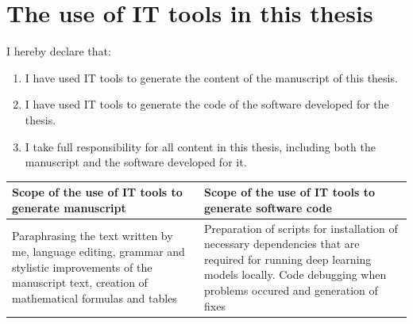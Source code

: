 \documentclass[12pt,a4paper]{article}
\begin{document}
\section*{The use of IT tools in this thesis}
\vspace{3pt}

I hereby declare that:
\begin{enumerate}
    \item I have used IT tools to generate the content of the manuscript of this thesis.
    \item I have used IT tools to generate the code of the software developed for the thesis.
    \item I take full responsibility for all content in this thesis, including both the manuscript and the software developed for it.
\end{enumerate}

\vspace{6pt}

\begin{table}[h]
\centering
\begin{tabular}{|p{}|p{}|}
\hline
\textbf{Scope of the use of IT tools to generate manuscript} &
\textbf{Scope of the use of IT tools to generate software code} \\ \hline
Paraphrasing the text written by me, language editing, grammar and stylistic improvements of the manuscript text, creation of mathematical formulas and tables &
Preparation of scripts for installation of necessary dependencies that are required for running deep learning models locally. Code debugging when problems occured and generation of fixes\\ \hline
\end{tabular}
\end{table}


    
\end{document}
